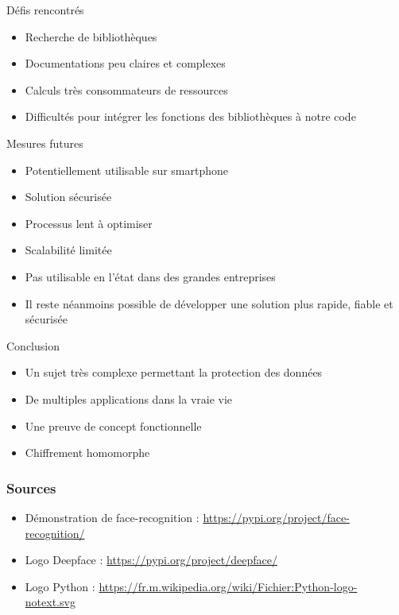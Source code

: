 \documentclass[9pt]{beamer}
\begin{document}
\begin{frame}{Défis rencontrés}

    \begin{itemize}
        \item Recherche de bibliothèques
        \item Documentations peu claires et complexes
        \item Calculs très consommateurs de ressources
        \item Difficultés pour intégrer les fonctions des bibliothèques à notre code
    \end{itemize}
    
\end{frame}

\begin{frame}{Mesures futures}
    \begin{itemize}
        \item Potentiellement utilisable sur smartphone
        \item Solution sécurisée
        \item Processus lent à optimiser
        \item Scalabilité limitée
        \item Pas utilisable en l'état dans des grandes entreprises
        \item Il reste néanmoins possible de développer une solution plus rapide, fiable et sécurisée
    \end{itemize}
\end{frame}

\begin{frame}{Conclusion}
    \begin{itemize}
        \item Un sujet très complexe permettant la protection des données
        \item De multiples applications dans la vraie vie
        \item Une preuve de concept fonctionnelle
        \item Chiffrement homomorphe
    \end{itemize}
\end{frame}

\begin{frame}[allowframebreaks]
    \frametitle{Sources}
    \begin{itemize}
        \label{src:face-reco-demo}\item Démonstration de face-recognition : \url{https://pypi.org/project/face-recognition/}
        \label{src:deepface-logo}\item Logo Deepface : \url{https://pypi.org/project/deepface/}
        \item \label{src:python-logo} Logo Python : \url{https://fr.m.wikipedia.org/wiki/Fichier:Python-logo-notext.svg}
    \end{itemize}
\end{frame}

\printbibliography
\end{document}
